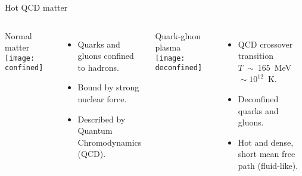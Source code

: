 \documentclass{beamer}
\begin{document}
\begin{frame}{Hot QCD matter}
  \begin{columns}
    \begin{center}
      Normal matter
      \texttt{[image: confined]}
    \end{center}
    \begin{itemize}
      \item Quarks and gluons confined to hadrons.
      \item Bound by strong nuclear force.
      \item Described by Quantum Chromodynamics (QCD).
    \end{itemize}

    \begin{center}
      Quark-gluon plasma
      \texttt{[image: deconfined]}
    \end{center}
    \begin{itemize}
      \item QCD crossover transition $T~\sim~165$~MeV${}\sim 10^{12}$~K.
      \item Deconfined quarks and gluons.
      \item Hot and dense, short mean free path (fluid-like).
    \end{itemize}

  \end{columns}
\end{frame}
\end{document}
